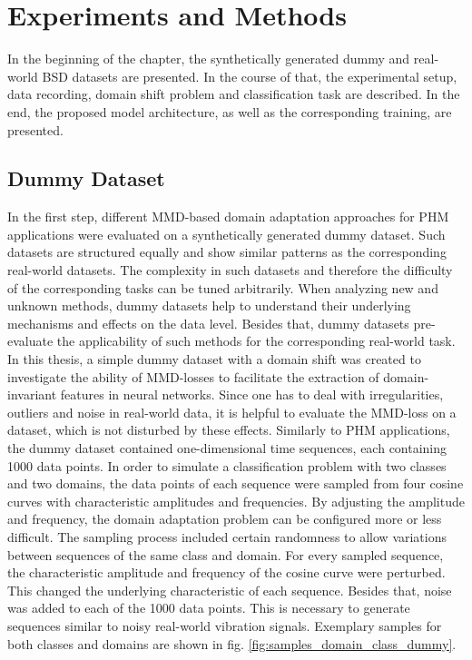 \chapter{Experiments and Methods}\label{chapter:experiments}
In the beginning of the chapter, the synthetically generated dummy and real-world BSD datasets are presented. In the course of that, the experimental setup, data recording, domain shift problem and classification task are described. In the end, the proposed model architecture, as well as the corresponding training, are presented. 
\section{Dummy Dataset}
In the first step, different MMD-based domain adaptation approaches for PHM applications were evaluated on a synthetically generated dummy dataset. Such datasets are structured equally and show similar patterns as the corresponding real-world datasets. The complexity in such datasets and therefore the difficulty of the corresponding tasks can be tuned arbitrarily. When analyzing new and unknown methods, dummy datasets help to understand their underlying mechanisms and effects on the data level. Besides that, dummy datasets pre-evaluate the applicability of such methods for the corresponding real-world task. In this thesis, a simple dummy dataset with a domain shift was created to investigate the ability of MMD-losses to facilitate the extraction of domain-invariant features in neural networks. Since one has to deal with irregularities, outliers and noise in real-world data, it is helpful to evaluate the MMD-loss on a dataset, which is not disturbed by these effects. Similarly to PHM applications, the dummy dataset contained one-dimensional time sequences, each containing 1000 data points. In order to simulate a classification problem with two classes and two domains, the data points of each sequence were sampled from four cosine curves with characteristic amplitudes and frequencies. By adjusting the amplitude and frequency, the domain adaptation problem can be configured more or less difficult. The sampling process included certain randomness to allow variations between sequences of the same class and domain. For every sampled sequence, the characteristic amplitude and frequency of the cosine curve were perturbed. This changed the underlying characteristic of each sequence. Besides that, noise was added to each of the 1000 data points. This is necessary to generate sequences similar to noisy real-world vibration signals. Exemplary samples for both classes and domains are shown in fig. \ref{fig:samples_domain_class_dummy}.

